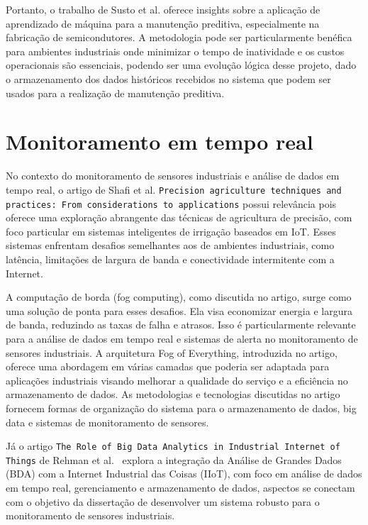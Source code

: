 Portanto, o trabalho de Susto et al. oferece insights sobre a aplicação de aprendizado de máquina para a manutenção preditiva, especialmente na fabricação de semicondutores. A metodologia pode ser particularmente benéfica para ambientes industriais onde minimizar o tempo de inatividade e os custos operacionais são essenciais, podendo ser uma evolução lógica desse projeto, dado o armazenamento dos dados históricos recebidos no sistema que podem ser usados para a realização de manutenção preditiva.


\section{Monitoramento em tempo real}

No contexto do monitoramento de sensores industriais e análise de dados em tempo real, o artigo de Shafi et al. \cite{shafi2019precision} \texttt{Precision agriculture techniques and practices: From considerations to applications} possui relevância pois oferece uma exploração abrangente das técnicas de agricultura de precisão, com foco particular em sistemas inteligentes de irrigação baseados em IoT. Esses sistemas enfrentam desafios semelhantes aos de ambientes industriais, como latência, limitações de largura de banda e conectividade intermitente com a Internet.
 
A computação de borda (fog computing), como discutida no artigo, surge como uma solução de ponta para esses desafios. Ela visa economizar energia e largura de banda, reduzindo as taxas de falha e atrasos. Isso é particularmente relevante para a análise de dados em tempo real e sistemas de alerta no monitoramento de sensores industriais. A arquitetura Fog of Everything, introduzida no artigo, oferece uma abordagem em várias camadas que poderia ser adaptada para aplicações industriais visando melhorar a qualidade do serviço e a eficiência no armazenamento de dados. As metodologias e tecnologias discutidas no artigo fornecem formas de organização do sistema para o armazenamento de dados, big data e sistemas de monitoramento de sensores.

Já o artigo \texttt{The Role of Big Data Analytics in Industrial Internet of Things} de Rehman et al.~\cite{REHMAN} explora a integração da Análise de Grandes Dados (BDA) com a Internet Industrial das Coisas (IIoT), com foco em análise de dados em tempo real, gerenciamento e armazenamento de dados, aspectos se conectam com o objetivo da dissertação de desenvolver um sistema robusto para o monitoramento de sensores industriais.

